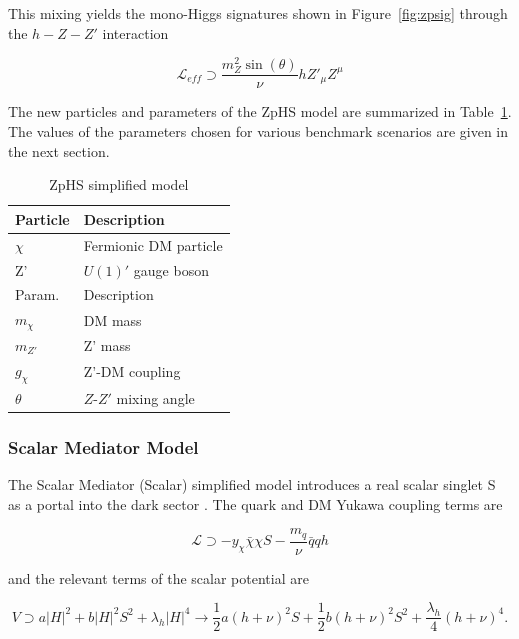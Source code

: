 This mixing yields the mono-Higgs signatures shown in Figure~\ref{fig:zpsig} through the $h-Z-Z'$ interaction 

\begin{equation}
\mathcal{L}_{eff} \supset \frac{m_Z^2 \sin(\theta)}{\nu} h Z'_\mu Z^\mu
\end{equation}

The new particles and parameters of the ZpHS model are summarized in Table~\ref{tab:ZpHS}. The values of the parameters chosen for various benchmark scenarios are given in the next section.

\begin{table}[htbH]
\begin{center}
\begin{tabular}{ l | l}
\hline
Particle & Description \\
\hline
$\chi$ & Fermionic DM particle \\
Z' & $U(1)'$ gauge boson \\
\hline
Param. & Description \\
\hline
$m_\chi$ & DM mass \\
$m_{Z'}$ & Z' mass \\
$g_\chi$ & Z'-DM coupling \\
$\theta$ & $Z$-$Z'$ mixing angle \\
\hline
\end{tabular}
\caption{ZpHS simplified model}\label{tab:ZpHS}
\end{center}
\end{table}

\subsubsection{Scalar Mediator Model}

The Scalar Mediator (Scalar) simplified model introduces a real scalar singlet S as a portal into the dark sector \cite{MarchRussell:2008yu}. The quark and DM Yukawa coupling terms are

\begin{equation}
\mathcal{L} \supset -y_\chi \bar{\chi} \chi S - \frac{m_q}{\nu} \bar{q} q h
\end{equation}

and the relevant terms of the scalar potential are

\begin{equation}
V \supset a |H|^2 + b |H|^2 S^2 + \lambda_h |H|^4 \rightarrow \frac{1}{2} a (h+\nu)^2 S + \frac{1}{2} b (h+\nu)^2 S^2 + \frac{\lambda_h}{4}(h+\nu)^4.
\end{equation}

